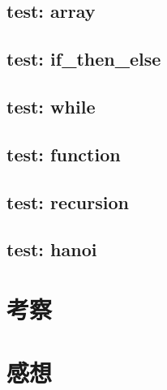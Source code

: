 \documentclass[dvipdfmx]{jsarticle}
\begin{document}
\subsection{test: array}
\subsection{test: if\_then\_else}
\subsection{test: while}
\subsection{test: function}
\subsection{test: recursion}
\subsection{test: hanoi}


\section{考察}



\section{感想}





\end{document}
